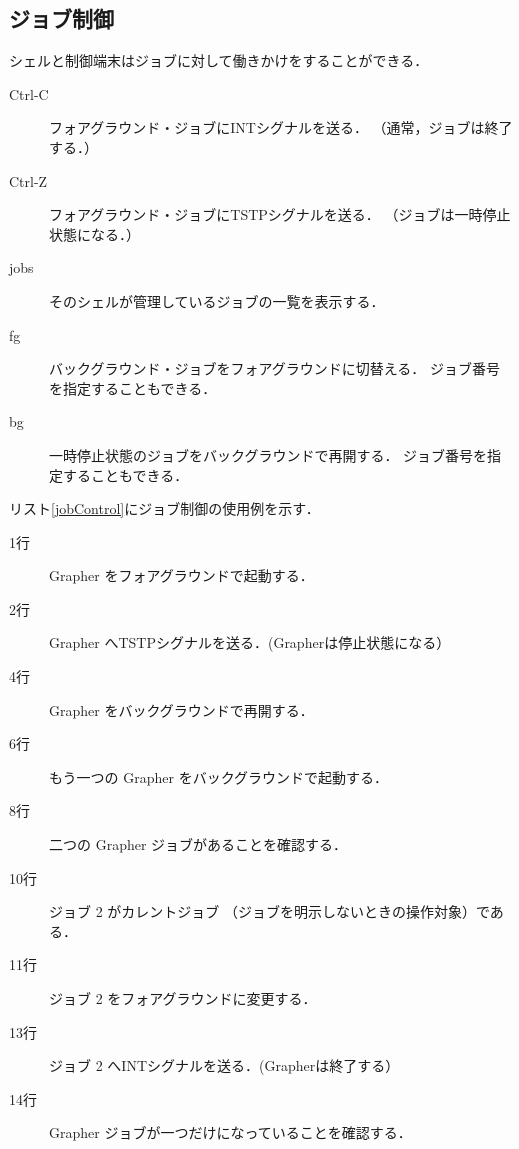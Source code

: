 

\subsection{ジョブ制御}
シェルと制御端末はジョブに対して働きかけをすることができる．

\begin{description}
\item[Ctrl-C] フォアグラウンド・ジョブにINTシグナルを送る．
（通常，ジョブは終了する．）

\item[Ctrl-Z] フォアグラウンド・ジョブにTSTPシグナルを送る．
（ジョブは一時停止状態になる．）

\item[jobs] そのシェルが管理しているジョブの一覧を表示する．

\item[fg] バックグラウンド・ジョブをフォアグラウンドに切替える．
ジョブ番号を指定することもできる．

\item[bg] 一時停止状態のジョブをバックグラウンドで再開する．
ジョブ番号を指定することもできる．
\end{description}

リスト\ref{jobControl}にジョブ制御の使用例を示す．
\begin{description}
\item [1行] Grapher をフォアグラウンドで起動する．
\item [2行] Grapher へTSTPシグナルを送る．(Grapherは停止状態になる）
\item [4行] Grapher をバックグラウンドで再開する．
\item [6行] もう一つの Grapher をバックグラウンドで起動する．
\item [8行] 二つの Grapher ジョブがあることを確認する．
\item [10行] ジョブ 2 がカレントジョブ
（ジョブを明示しないときの操作対象）である．
\item [11行] ジョブ 2 をフォアグラウンドに変更する．
\item [13行] ジョブ 2 へINTシグナルを送る．(Grapherは終了する）
\item [14行] Grapher ジョブが一つだけになっていることを確認する．
\end{description}




